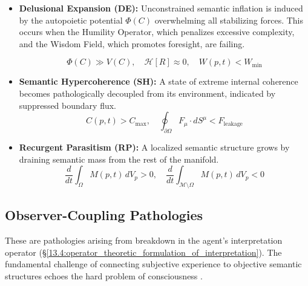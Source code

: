 \begin{itemize}

    \item \textbf{Delusional Expansion (DE):} Unconstrained semantic inflation is induced by the autopoietic potential \(\Phi(C)\) overwhelming all stabilizing forces. This occurs when the Humility Operator, which penalizes excessive complexity, and the Wisdom Field, which promotes foresight, are failing.
    
    \begin{equation}
    \Phi(C) \gg V(C), \quad \mathcal{H}[R] \approx 0, \quad W(p,t) < W_{\text{min}}
    \end{equation}

    \item \textbf{Semantic Hypercoherence (SH):} A state of extreme internal coherence becomes pathologically decoupled from its environment, indicated by suppressed boundary flux.
    \begin{equation}
    C(p,t) > C_{\text{max}}, \quad \oint_{\partial \Omega} F_\mu \cdot dS^\mu < F_{\text{leakage}}
    \end{equation}

    \item \textbf{Recurgent Parasitism (RP):} A localized semantic structure grows by draining semantic mass from the rest of the manifold.
    \begin{equation}
    \frac{d}{dt}\int_{\Omega} M(p,t) \, dV_p > 0, \quad \frac{d}{dt}\int_{\mathcal{M}\setminus\Omega} M(p,t) \, dV_p < 0
    \end{equation}

\end{itemize}


\subsection{Observer-Coupling Pathologies}
\label{16.2.4:observer_coupling_pathologies}

These are pathologies arising from breakdown in the agent's interpretation operator (\S\ref{13.4:operator_theoretic_formulation_of_interpretation}). The fundamental challenge of connecting subjective experience to objective semantic structures echoes the hard problem of consciousness \autocite{Chalmers1996}.

